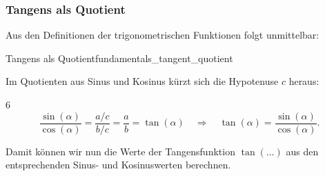 \subsubsection{Tangens als Quotient}

Aus den Definitionen der trigonometrischen Funktionen folgt unmittelbar:

\begin{KeyPointBox}{Tangens als Quotient}{fundamentals_tangent_quotient}
  \noindent
  \begin{minipage}[c]{0.73\linewidth}
    Im Quotienten aus Sinus und Kosinus kürzt sich die Hypotenuse $c$ heraus:
    \begin{ClozeArea}[23]{6}
      \[
        \frac{\sin(\alpha)}{\cos(\alpha)}
          =\frac{a/c}{b/c}
           =\frac{a}{b}
           =\tan(\alpha)
        \quad\Longrightarrow\quad
        \tan(\alpha)=\frac{\sin(\alpha)}{\cos(\alpha)}.
      \]
    \end{ClozeArea}
  \end{minipage}\hfill
  \begin{minipage}[c]{0.23\linewidth}
    \centering
  \end{minipage}
\end{KeyPointBox}

Damit können wir nun die Werte der Tangensfunktion $\tan(\ldots)$ aus den entsprechenden Sinus- und
Kosinuswerten berechnen.

\IfClozeTF{\clearpage}{}
